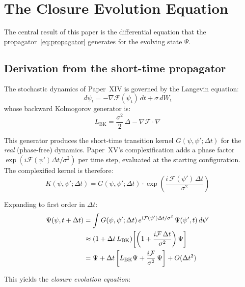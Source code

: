 \documentclass[12pt]{article}
\newcommand{\Fcal}{\mathcal{F}}
\begin{document}
\section{The Closure Evolution Equation}\label{sec:evolution}

The central result of this paper is the differential equation that the propagator~\eqref{eq:propagator} generates for the evolving state $\Psi$.

\subsection{Derivation from the short-time propagator}

The stochastic dynamics of Paper~XIV is governed by the Langevin equation:
\begin{equation}
    d\psi_t = -\nabla\Fcal(\psi_t)\, dt + \sigma\, dW_t
\end{equation}
whose backward Kolmogorov generator is:
\begin{equation}
    L_{\mathrm{BK}} = \frac{\sigma^2}{2}\,\Delta - \nabla\Fcal \cdot \nabla
\end{equation}

This generator produces the short-time transition kernel $G(\psi, \psi'; \Delta t)$ for the \textit{real} (phase-free) dynamics. Paper~XV's complexification adds a phase factor $\exp(i\Fcal(\psi')\Delta t/\sigma^2)$ per time step, evaluated at the starting configuration. The complexified kernel is therefore:
\begin{equation}
    K(\psi, \psi'; \Delta t) = G(\psi, \psi'; \Delta t) \cdot \exp\!\left(\frac{i\, \Fcal(\psi')\, \Delta t}{\sigma^2}\right)
\end{equation}

Expanding to first order in $\Delta t$:
\begin{align}
    \Psi(\psi, t+\Delta t) &= \int G(\psi, \psi'; \Delta t)\, e^{i\Fcal(\psi')\Delta t/\sigma^2}\, \Psi(\psi', t)\, d\psi' \notag \\
    &\approx (1 + \Delta t\, L_{\mathrm{BK}})\!\left[\left(1 + \frac{i\Fcal\,\Delta t}{\sigma^2}\right)\Psi\right] \notag \\
    &= \Psi + \Delta t\left[L_{\mathrm{BK}}\Psi + \frac{i\Fcal}{\sigma^2}\,\Psi\right] + O(\Delta t^2)
\end{align}

This yields the \textit{closure evolution equation}:
\end{document}

